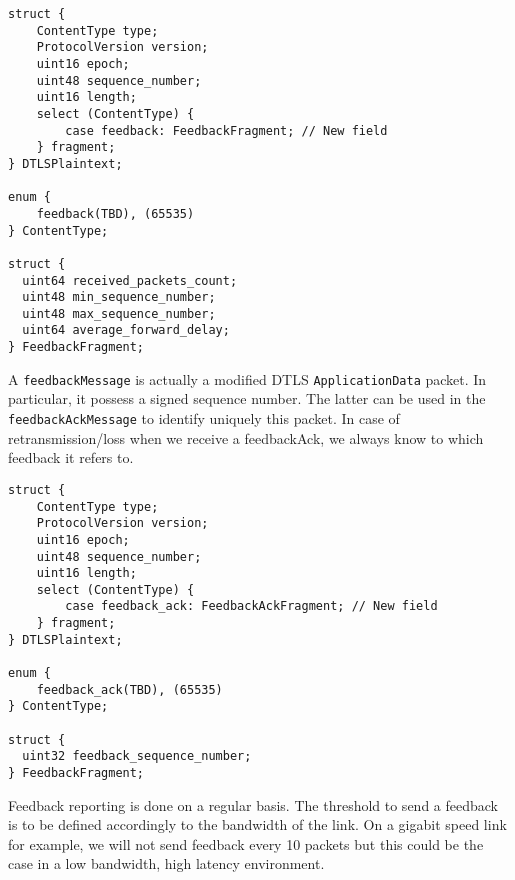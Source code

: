 
\begin{lstlisting}[caption= Feedback message structure, label=lst:feedbackM]
struct {
    ContentType type;
    ProtocolVersion version;
    uint16 epoch;
    uint48 sequence_number;
    uint16 length;
    select (ContentType) {
        case feedback: FeedbackFragment; // New field
    } fragment;
} DTLSPlaintext;

enum {
    feedback(TBD), (65535)
} ContentType;

struct {
  uint64 received_packets_count;
  uint48 min_sequence_number;
  uint48 max_sequence_number;
  uint64 average_forward_delay;
} FeedbackFragment;
\end{lstlisting}

A \verb!feedbackMessage! is actually a modified DTLS \verb!ApplicationData! packet. In particular, it possess a signed sequence number. The latter can be used in the \verb!feedbackAckMessage! to identify uniquely this packet. In case of retransmission/loss when we receive a feedbackAck, we always know to which feedback it refers to.

\begin{lstlisting}[caption = Feedback Ack structure, label=lst:feedbackA]
struct {
    ContentType type;
    ProtocolVersion version;
    uint16 epoch;
    uint48 sequence_number;
    uint16 length;
    select (ContentType) {
        case feedback_ack: FeedbackAckFragment; // New field
    } fragment;
} DTLSPlaintext;

enum {
    feedback_ack(TBD), (65535)
} ContentType;

struct {
  uint32 feedback_sequence_number;
} FeedbackFragment;
\end{lstlisting}

Feedback reporting is done on a regular basis. The threshold to send a feedback is to be defined accordingly to the bandwidth of the link. On a gigabit speed link for example, we will not send feedback every 10 packets but this could be the case in a low bandwidth, high latency environment.

